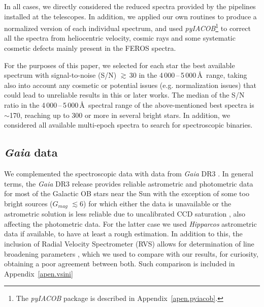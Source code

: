 \documentclass{aa}
\newcommand{\ls}{\mbox{$\lesssim$}}
\newcommand{\gs}{\mbox{$\gtrsim$}}
\begin{document}
In all cases, we directly considered the reduced spectra provided by the pipelines installed at the telescopes. In addition, we applied our own routines to produce a normalized version of each individual spectrum, and used \textit{pyIACOB}\footnote{The \textit{pyIACOB} package is described in Appendix~\ref{apen.pyiacob}.} to correct all the spectra from heliocentric velocity, cosmic rays and some systematic cosmetic defects mainly present in the FEROS spectra.

For the purposes of this paper, we selected for each star the best available spectrum with signal-to-noise (S/N) \gs\,30 in the 4\,000\,--\,5\,000\,\AA\ range, taking also into account any cosmetic or potential issues (e.g. normalization issues) that could lead to unreliable results in this or later works. %
The median of the S/N ratio in the 4\,000\,--\,5\,000\,\AA\ spectral range of the above-mentioned best spectra is $\sim$170, reaching up to 300 or more in several bright stars. In addition, we considered all available multi-epoch spectra to search for spectroscopic binaries.





\subsection{{\em Gaia} data}
\label{subsection:22_YYYYY}

We complemented the spectroscopic data with data from {\em Gaia} DR3 \citep{2016A&A...595A...1G,2022arXiv220800211G,2022arXiv220605989B}. In general terms, the {\em Gaia} DR3 release provides reliable astrometric and photometric data for most of the Galactic OB stars near the Sun with the exception of some too bright sources ($G_{mag}$ \ls 6) for which either the data is unavailable or the astrometric solution is less reliable due to uncalibrated CCD saturation \citep{2018A&A...616A...2L}, also affecting the photometric data. For the latter case we used \textit{Hipparcos} \citep{1997A&A...323L..49P} astrometric data if available, to have at least a rough estimation. In addition to this, the inclusion of Radial Velocity Spectrometer (RVS) allows for determination of line broadening parameters \citep{2022arXiv220610986F}, which we used to compare with our results, for curiosity, obtaining a poor agreement between both. Such comparison is included in Appendix~\ref{apen.vsini}
\end{document}
